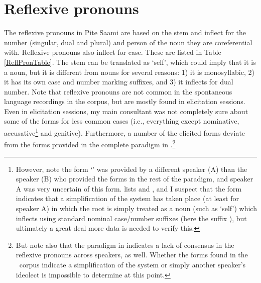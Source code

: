 
\FloatBarrier



\section{Reflexive pronouns}\label{reflexivePronouns}
The reflexive pronouns in Pite Saami are based on the stem  and inflect for the number (singular, dual and plural) and person of the noun they are coreferential with. Reflexive pronouns also inflect for case. These are listed in Table \vref{ReflPronTable}. 
The stem  can be translated as ‘self’, which could imply that it is a noun, but it is different from nouns for several reasons: 1) it is monosyllabic, 2) it has its own case and number marking suffixes, and 3) it inflects for dual number. %
Note that reflexive pronouns are not common in the spontaneous language recordings in the corpus, but are mostly found in elicitation sessions. Even in elicitation sessions, my main consultant was not completely sure about some of the forms for less common cases (i.e., everything except nominative, accusative\footnote{However, note the form  ‘’ was provided by a different speaker (A) than the speaker (B) who provided the forms in the rest of the paradigm, and speaker A was very uncertain of this form. \citet[162]{Lehtiranta1992} lists  and , and I suspect that the form  indicates that a simplification of the system has taken place (at least for speaker A) in which the root  is simply treated as a noun (such as ‘self’) which inflects using standard nominal case/number suffixes (here the  suffix ), but ultimately a great deal more data is needed to verify this.} 
and genitive). Furthermore, a number of the elicited forms deviate from the forms provided in the complete paradigm in \citet[162]{Lehtiranta1992}.\footnote{But note also that the paradigm in \citet[162]{Lehtiranta1992} indicates a lack of consensus in the reflexive pronouns across speakers, as well. Whether the forms found in the \PSDP\ corpus indicate a simplification of the system or simply another speaker’s ideolect is impossible to determine at this point.}


